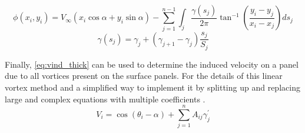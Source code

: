 \begin{equation}
  \label{eq:phi_thick}
    \phi\left(x_{i}, y_{i}\right)=V_{\infty}\left(x_{i} \cos \alpha+y_{i} \sin \alpha\right)-\sum_{j=1}^{n-1} \int_{j} \frac{\gamma\left(s_{j}\right)}{2 \pi} \tan ^{-1}\left(\frac{y_{i}-y_{j}}{x_{i}-x_{j}}\right) d s_{j}
  \end{equation}
  \begin{equation}
    \gamma\left(s_{j}\right)=\gamma_{j}+\left(\gamma_{j+1}-\gamma_{j}\right) \frac{s_{j}}{S_{j}}
    \end{equation}
\medskip


Finally, \cref{eq:vind_thick} can be used to determine the induced velocity on a
panel due to all vortices present on the surface panels. For the details of this
linear vortex method and a simplified way to implement it by splitting up and
replacing large and complex equations with multiple coefficients
\citeauthor{kuethe_chow_1998}\cite{kuethe_chow_1998}
.
\begin{equation}
  \label{eq:vind_thick}
  V_{i}=\cos \left(\theta_{i}-\alpha\right)+\sum_{j=1}^{n} A_{i j} \gamma_{j}^{\prime}
\end{equation}

